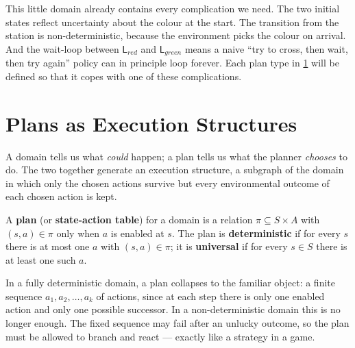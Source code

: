 This little domain already contains every complication we need.  The
two initial states reflect uncertainty about the colour at the start.
The transition from the station is non-deterministic, because the
environment picks the colour on arrival.  And the wait-loop between
$\mathsf{L}_\mathit{red}$ and $\mathsf{L}_\mathit{green}$ means a naive
``try to cross, then wait, then try again'' policy can in principle
loop forever.  Each plan type in \cref{sec:plans-execution-structures}
will be defined so that it copes with one of these complications.


\section{Plans as Execution Structures}
\label{sec:plans-execution-structures}

A domain tells us what \emph{could} happen; a plan tells us what the
planner \emph{chooses} to do.  The two together generate an execution
structure, a subgraph of the domain in which only the chosen actions
survive but every environmental outcome of each chosen action is kept.

\begin{definition}
\label{def:plan}
A \textbf{plan} (or \textbf{state-action table}) for a domain is a
relation $\pi\subseteq S\times A$ with $(s,a)\in\pi$ only when $a$ is
enabled at $s$.  The plan is \textbf{deterministic} if for every $s$
there is at most one $a$ with $(s,a)\in\pi$; it is \textbf{universal}
if for every $s\in S$ there is at least one such $a$.
\end{definition}

In a fully deterministic domain, a plan collapses to the familiar
object: a finite sequence $a_1,a_2,\ldots,a_k$ of actions, since at
each step there is only one enabled action and only one possible
successor.  In a non-deterministic domain this is no longer enough.
The fixed sequence may fail after an unlucky outcome, so the plan must
be allowed to branch and react --- exactly like a strategy in a game.

